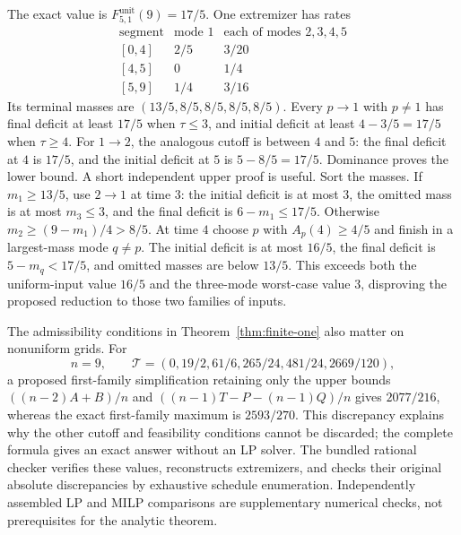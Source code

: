 \begin{example}\label{ex:five-nine}
The exact value is $F^{\mathrm{unit}}_{5,1}(9)=17/5$. One extremizer has
rates
\[
\begin{array}{c|cc}
\text{segment}&\text{mode }1&\text{each of modes }2,3,4,5\\\hline
{[0,4]}&2/5&3/20\\
{[4,5]}&0&1/4\\
{[5,9]}&1/4&3/16
\end{array}
\]
Its terminal masses are $(13/5,8/5,8/5,8/5,8/5)$.
Every $p\to1$ with $p\ne1$ has final deficit at least $17/5$ when
$\tau\le3$, and initial deficit at least $4-3/5=17/5$ when $\tau\ge4$.
For $1\to2$, the analogous cutoff is between $4$ and $5$:
the final deficit at $4$ is $17/5$, and the initial deficit at $5$ is
$5-8/5=17/5$. Dominance proves the lower bound.
A short independent upper proof is useful. Sort the masses. If
$m_1\ge13/5$, use $2\to1$ at time $3$: the initial deficit is at most
$3$, the omitted mass is at most $m_3\le3$, and the final deficit is
$6-m_1\le17/5$. Otherwise $m_2\ge(9-m_1)/4>8/5$.
At time $4$ choose $p$ with $A_p(4)\ge4/5$ and finish in a largest-mass
mode $q\ne p$. The initial deficit is at most $16/5$, the final deficit
is $5-m_q<17/5$, and omitted masses are below $13/5$.
This exceeds both the uniform-input value $16/5$ and the three-mode
worst-case value $3$, disproving the proposed reduction to those two
families of inputs.
\end{example}

The admissibility conditions in Theorem~\ref{thm:finite-one} also matter
on nonuniform grids. For
\[
 n=9,\qquad
 \mathcal T=(0,19/2,61/6,265/24,481/24,2669/120),
\]
a proposed first-family simplification retaining only the upper bounds
$((n-2)A+B)/n$ and $((n-1)T-P-(n-1)Q)/n$ gives $2077/216$,
whereas the exact first-family maximum is $2593/270$.
This discrepancy explains why the other cutoff and feasibility conditions
cannot be discarded; the complete formula gives an exact answer without
an LP solver. The bundled rational checker verifies these values,
reconstructs extremizers, and checks their original absolute discrepancies
by exhaustive schedule enumeration. Independently assembled LP and MILP
comparisons are supplementary numerical checks, not prerequisites for the
analytic theorem.
